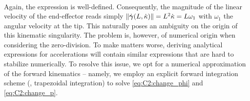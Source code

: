 \begin{rmk}
\begin{align}
\end{align}
%
Again, the expression is well-defined. Consequently, the magnitude of the linear velocity of the end-effector reads simply $\lVert \dot{{\boldsymbol{\gamma}}}(L,\dot{\kappa}) \rVert = L^2\dot{\kappa} = L \omega_1$ with $\omega_1$ the angular velocity at the tip. This naturally poses an ambiguity on the origin of this kinematic singularity. The problem is, however, of numerical origin when considering the zero-division. To make matters worse, deriving analytical expressions for accelerations will contain similar expressions that are hard to stabilize numerically. To resolve this issue, we opt for a numerical approximation of the forward kinematics -- namely, we employ an explicit forward integration scheme (\ie, trapezoidal integration) to solve \eqref{eq:C2:change_phi} and \eqref{eq:C2:change_p}.
\end{rmk}

